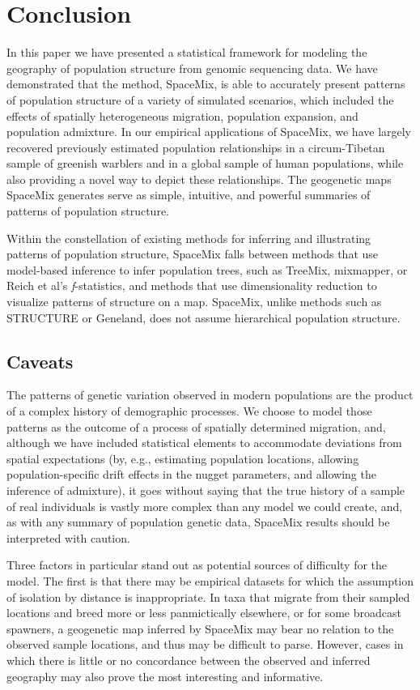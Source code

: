 \documentclass[12pt]{article}
\begin{document}
\section*{Conclusion}
In this paper we have presented a statistical framework for modeling the geography of population structure from genomic sequencing data.
We have demonstrated that the method, SpaceMix, is able to accurately present patterns of population structure of a variety of simulated scenarios, which included the effects of spatially heterogeneous migration, population expansion, and population admixture.  In our empirical applications of SpaceMix, we have largely recovered previously estimated population relationships in a circum-Tibetan sample of greenish warblers and in a global sample of human populations, while also providing a novel way to depict these relationships.  The geogenetic maps SpaceMix generates serve as simple, intuitive, and powerful summaries of patterns of population structure.

Within the constellation of existing methods for inferring and illustrating patterns of population structure, SpaceMix falls between methods that use model-based inference to infer population trees, such as TreeMix, mixmapper, or Reich et al's \textit{f}-statistics, and methods that use dimensionality reduction to visualize patterns of structure on a map.  SpaceMix, unlike methods such as STRUCTURE or Geneland, does not assume hierarchical population structure. %

\subsection*{Caveats}
The patterns of genetic variation observed in modern populations are the product of a complex history of demographic processes.  We choose to model those patterns as the outcome of a process of spatially determined migration, and, although we have included statistical elements to accommodate deviations from spatial expectations (by, e.g., estimating population locations, allowing population-specific drift effects in the nugget parameters, and allowing the inference of admixture), it goes without saying that the true history of a sample of real individuals is vastly more complex than any model we could create, 
and, as with any summary of population genetic data, 
SpaceMix results should be interpreted with caution.

Three factors in particular stand out as potential sources of difficulty for the model.  The first is that there may be empirical datasets for which the assumption of isolation by distance is inappropriate.  In taxa that migrate from their sampled locations and breed more or less panmictically elsewhere,
or for some broadcast spawners, 
a geogenetic map inferred by SpaceMix may bear no relation to the observed sample locations, and thus may be difficult to parse.  However, cases in which there is little or no concordance between the observed and inferred geography may also prove the most interesting and informative.
\end{document}
